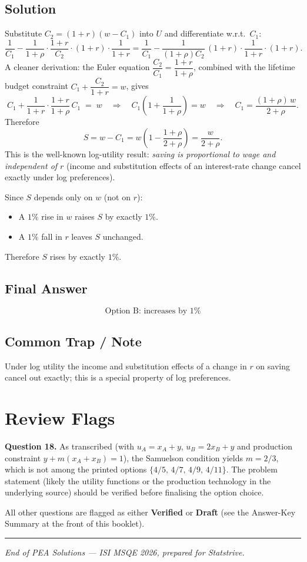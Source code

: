 \documentclass[11pt]{article}
\begin{document}
\subsection*{Solution}
Substitute $C_2 = (1+r)(w - C_1)$ into $U$ and differentiate w.r.t.\ $C_1$:
\[
\frac{1}{C_1} - \frac{1}{1+\rho}\cdot \frac{1+r}{C_2}\cdot(1+r)\cdot\frac{1}{1+r}
= \frac{1}{C_1} - \frac{1}{(1+\rho) C_2}\,(1+r)\cdot\frac{1}{1+r} \cdot (1+r).
\]
A cleaner derivation: the Euler equation $\dfrac{C_2}{C_1} = \dfrac{1+r}{1+\rho}$, combined with the lifetime budget constraint $C_1 + \dfrac{C_2}{1+r} = w$, gives
\[
C_1 + \frac{1}{1+r}\cdot \frac{1+r}{1+\rho}\,C_1 \;=\; w
\quad\Longrightarrow\quad C_1\!\left(1 + \frac{1}{1+\rho}\right) = w
\quad\Longrightarrow\quad C_1 = \frac{(1+\rho)\,w}{2+\rho}.
\]
Therefore
\[
S = w - C_1 = w\!\left(1 - \frac{1+\rho}{2+\rho}\right) = \frac{w}{2+\rho}.
\]
This is the well-known log-utility result: \emph{saving is proportional to wage
and independent of $r$} (income and substitution effects of an interest-rate
change cancel exactly under log preferences).

Since $S$ depends only on $w$ (not on $r$):
\begin{itemize}
\item A $1\%$ rise in $w$ raises $S$ by exactly $1\%$.
\item A $1\%$ fall in $r$ leaves $S$ unchanged.
\end{itemize}
Therefore $S$ rises by exactly $1\%$.

\subsection*{Final Answer}
\[
\boxed{\text{Option B: increases by } 1\%}
\]

\subsection*{Common Trap / Note}
Under log utility the income and substitution effects of a change in $r$ on
saving cancel out exactly; this is a special property of log preferences.

\newpage
\section*{Review Flags}

\textbf{Question 18.} As transcribed (with $u_A = x_A + y$, $u_B = 2x_B + y$ and
production constraint $y + m(x_A + x_B) = 1$), the Samuelson condition yields
$m = 2/3$, which is not among the printed options $\{4/5,\,4/7,\,4/9,\,4/11\}$.
The problem statement (likely the utility functions or the production technology
in the underlying source) should be verified before finalising the option choice.

All other questions are flagged as either \textbf{Verified} or \textbf{Draft}
(see the Answer-Key Summary at the front of this booklet).

\bigskip
\hrule
\bigskip
\begin{center}
\textit{End of PEA Solutions --- ISI MSQE 2026, prepared for Statstrive.}
\end{center}
\end{document}
